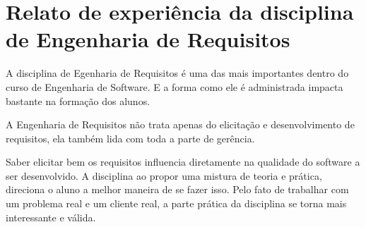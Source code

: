 \section[Relato de experiência da disciplina de Engenharia de Requisitos]{Relato de experiência da disciplina de Engenharia de Requisitos}
A disciplina de Egenharia de Requisitos é uma das mais importantes dentro do
curso de Engenharia de Software. E a forma como ele é administrada impacta bastante
na formação dos alunos.

A Engenharia de Requisitos não trata apenas do elicitação e desenvolvimento de
requisitos, ela também lida com toda a parte de gerência.

Saber elicitar bem os requisitos influencia diretamente na qualidade do software
a ser desenvolvido. A disciplina ao propor uma mistura de teoria e prática,
direciona o aluno a melhor maneira de se fazer isso. Pelo fato de trabalhar com
um problema real e um cliente real, a parte prática da disciplina se torna mais
interessante e válida.
